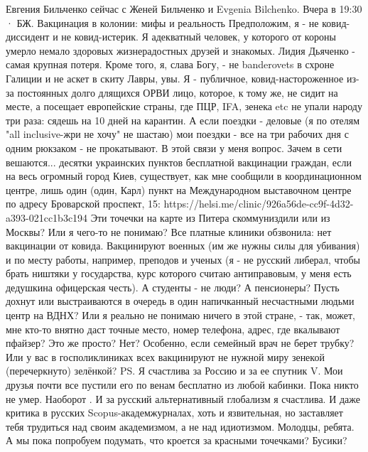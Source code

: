 \documentclass[a4paper,11pt]{extreport}
\begin{document}
Евгения Бильченко сейчас с Женей Бильченко и Evgenia Bilchenko.
Вчера в 19:30 ·
БЖ. Вакцинация в колонии: мифы и реальность
Предположим, я - не ковид-диссидент и не ковид-истерик. Я адекватный человек, у которого от короны умерло немало здоровых жизнерадостных друзей и знакомых. Лидия Дьяченко - самая крупная потеря. Кроме того, я, слава Богу, - не banderovets в схроне Галиции и не аскет в скиту Лавры, увы.
Я - публичное, ковид-настороженное из-за постоянных долго длящихся ОРВИ лицо, которое, к тому же, не сидит на месте, а посещает европейские страны, где ПЦР, IFA, зенека etc не упали народу три раза: сядешь на 10 дней на карантин. А если поездки - деловые (я по отелям "all inclusive-жри не хочу" не шастаю) мои поездки - все на три рабочих дня с одним рюкзаком - не прокатывают.
В этой связи у меня вопрос. Зачем в сети вешаются... десятки украинских пунктов бесплатной вакцинации граждан, если на весь огромный город Киев, существует, как мне сообщили в координационном центре, лишь один (один, Карл) пункт на Международном выставочном центре по адресу Броварской проспект, 15: https://helsi.me/clinic/926a56de-cc9f-4d32-a393-021cc1b3c194
Эти точечки на карте из Питера скоммуниздили или из Москвы? Или я чего-то не понимаю? Все платные клиники обзвонила: нет вакцинации от ковида. Вакцинируют военных (им же нужны силы для убивания) и по месту работы, например, преподов и ученых (я - не русский либерал, чтобы брать ништяки у государства, курс которого считаю антиправовым, у меня есть дедушкина офицерская честь).
А студенты - не люди? А пенсионеры? Пусть дохнут или выстраиваются в очередь в один напичканный несчастными людьми центр на ВДНХ? Или я реально не понимаю ничего в этой стране, - так, может, мне кто-то внятно даст точные место, номер телефона, адрес, где вкалывают пфайзер? Это же просто? Нет? Особенно, если семейный врач не берет трубку? Или у вас в госполиклиниках всех вакцинируют не нужной миру зенекой (перечеркнуто) зелёнкой?
PS. Я счастлива за Россию и за ее спутник V. Мои друзья почти все пустили его по венам бесплатно из любой кабинки. Пока никто не умер. Наоборот . И за русский альтернативный глобализм я счастлива. И даже критика в русских Scopus-академжурналах, хоть и язвительная, но заставляет тебя трудиться над своим академизмом, а не над идиотизмом. Молодцы, ребята. А мы пока попробуем подумать, что кроется за красными точечками? Бусики?
\end{document}
